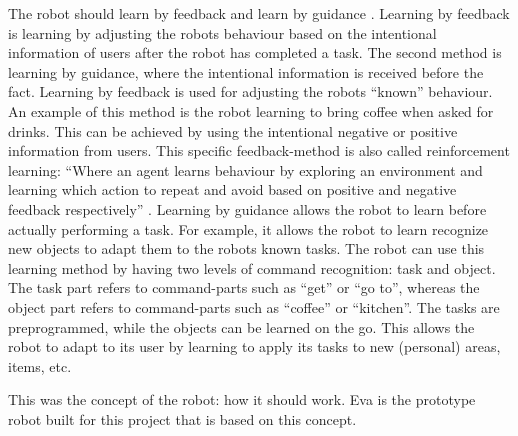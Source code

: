 \documentclass[project_eva.tex]{subfiles}
\begin{document}
The robot should learn by feedback and learn by guidance \cite{Thomaz} . Learning by feedback is learning by adjusting the robot\textquotesingle s behaviour based on the intentional information of users after the robot has completed a task. The second method is learning by guidance, where the intentional information is received before the fact. Learning by feedback is used for adjusting the robot\textquotesingle s ``known'' behaviour. An example of this method is the robot learning to bring coffee when asked for drinks. This can be achieved by using the intentional negative or positive information from users.  This specific feedback-method is also called reinforcement learning: ``Where an agent learns behaviour by exploring an environment and learning which action to repeat and avoid based on positive and negative feedback respectively'' \cite{Joost}. 
Learning by guidance allows the robot to learn before actually performing a task. For example, it allows the robot to learn recognize new objects to adapt them to the robot\textquotesingle s known tasks. The robot can use this learning method by having two levels of command recognition: task and object. The task part refers to command-parts such as ``get'' or ``go to'', whereas the object part refers to command-parts such as ``coffee'' or ``kitchen''. The tasks are preprogrammed, while the objects can be learned on the go. This allows the robot to adapt to its user by learning to apply its tasks to new (personal) areas, items, etc. 

This was the concept of the robot: how it should work. Eva is the prototype robot built for this project that is based on this concept.
\end{document}
